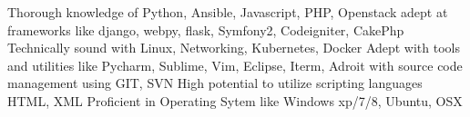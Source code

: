 
\begin{cvskills}
  \cvskill
    {Thorough knowledge of }
    {Python, Ansible, Javascript, PHP, Openstack}
  \cvskill
    {adept at frameworks like}
    {django, webpy, flask, Symfony2, Codeigniter, CakePhp}
  \cvskill
    {Technically sound with}
    {Linux, Networking, Kubernetes, Docker}
  \cvskill
    {Adept with tools and utilities like}
    {Pycharm, Sublime, Vim, Eclipse, Iterm, }
  \cvskill
    {Adroit with source code management using}
    {GIT, SVN}
  \cvskill
    {High potential to utilize scripting languages}
    {HTML, XML}
  \cvskill
  {Proficient in Operating Sytem like}
  {Windows xp/7/8, Ubuntu, OSX}
\end{cvskills}